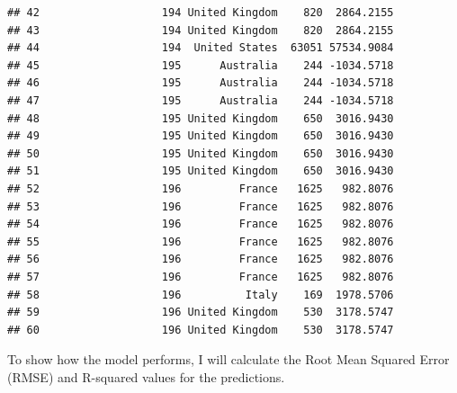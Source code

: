 \documentclass[
]{article}
\newenvironment{Shaded}{\begin{snugshade}}{\end{snugshade}}
\newcommand{\CommentTok}[1]{\textcolor[rgb]{0.56,0.35,0.01}{\textit{#1}}}
\newcommand{\DecValTok}[1]{\textcolor[rgb]{0.00,0.00,0.81}{#1}}
\newcommand{\FunctionTok}[1]{\textcolor[rgb]{0.13,0.29,0.53}{\textbf{#1}}}
\newcommand{\NormalTok}[1]{#1}
\newcommand{\OtherTok}[1]{\textcolor[rgb]{0.56,0.35,0.01}{#1}}
\newcommand{\SpecialCharTok}[1]{\textcolor[rgb]{0.81,0.36,0.00}{\textbf{#1}}}
\newcommand{\StringTok}[1]{\textcolor[rgb]{0.31,0.60,0.02}{#1}}
\begin{document}
\begin{verbatim}
## 42                   194 United Kingdom    820  2864.2155
## 43                   194 United Kingdom    820  2864.2155
## 44                   194  United States  63051 57534.9084
## 45                   195      Australia    244 -1034.5718
## 46                   195      Australia    244 -1034.5718
## 47                   195      Australia    244 -1034.5718
## 48                   195 United Kingdom    650  3016.9430
## 49                   195 United Kingdom    650  3016.9430
## 50                   195 United Kingdom    650  3016.9430
## 51                   195 United Kingdom    650  3016.9430
## 52                   196         France   1625   982.8076
## 53                   196         France   1625   982.8076
## 54                   196         France   1625   982.8076
## 55                   196         France   1625   982.8076
## 56                   196         France   1625   982.8076
## 57                   196         France   1625   982.8076
## 58                   196          Italy    169  1978.5706
## 59                   196 United Kingdom    530  3178.5747
## 60                   196 United Kingdom    530  3178.5747
\end{verbatim}

\vspace{1cm}

To show how the model performs, I will calculate the Root Mean Squared
Error (RMSE) and R-squared values for the predictions.

\begin{Shaded}
\end{Shaded}
\end{document}
